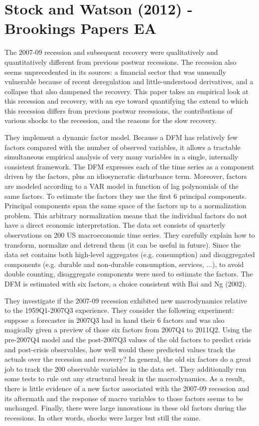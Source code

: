 \documentclass{article}
\begin{document}
{\section*{Stock and Watson (2012) - Brookings Papers EA}

The 2007-09 recession and subsequent recovery were qualitatively and quantitatively different from previous postwar recessions. The recession also seems unprecedented in its sources: a financial sector that was unusually vulnerable because of recent deregulation and little-understood derivatives, and a collapse that also dampened the recovery. This paper takes an empirical look at this recession and recovery, with an eye toward quantifying the extend to which this recession differs from previous postwar recessions, the contributions of various shocks to the recession, and the reasons for the slow recovery.

They implement a dynamic factor model. Because a DFM has relatively few factors compared with the number of observed variables, it allows a tractable simultaneous empirical analysis of very many variables in a single, internally consistent framework. The DFM expresses each of the time series as a component driven by the factors, plus an idiosyncratic disturbance term. Moreover, factors are modeled according to a VAR model in function of lag polynomials of the same factors. To estimate the factors they use the first 6 principal components. Principal components span the same space of the factors up to a normalization problem. This arbitrary normalization means that the individual factors do not have a direct economic interpretation. The data set consists of quarterly observations on 200 US macroeconomic time series. They carefully explain how to transform, normalize and detrend them (it can be useful in future). Since the data set contains both high-level aggregates (e.g. consumption) and disaggregated components (e.g. durable and non-durable consumption, services, ...), to avoid double counting, disaggregate components were used to estimate the factors. The DFM is estimated with six factors, a choice consistent with Bai and Ng (2002).

They investigate if the 2007-09 recession exhibited new macrodynamics relative to the 1959Q1-2007Q3 experience. They consider the following experiment: suppose a forecaster in 2007Q3 had in hand their 6 factors and was also magically given a preview of those six factors from 2007Q4 to 2011Q2. Using the pre-2007Q4 model and the post-2007Q3 values of the old factors to predict crisis and post-crisis observables, how well would these predicted values track the actuals over the recession and recovery? In general, the old six factors do a great job to track the 200 observable variables in the data set. They additionally run some tests to rule out any structural break in the macrodynamics. As a result, there is little evidence of a new factor associated with the 2007-09 recession and its aftermath and the response of macro variables to those factors seems to be unchanged. Finally, there were large innovations in these old factors during the recessions. In other words, shocks were larger but still the same. 

}
\end{document}
